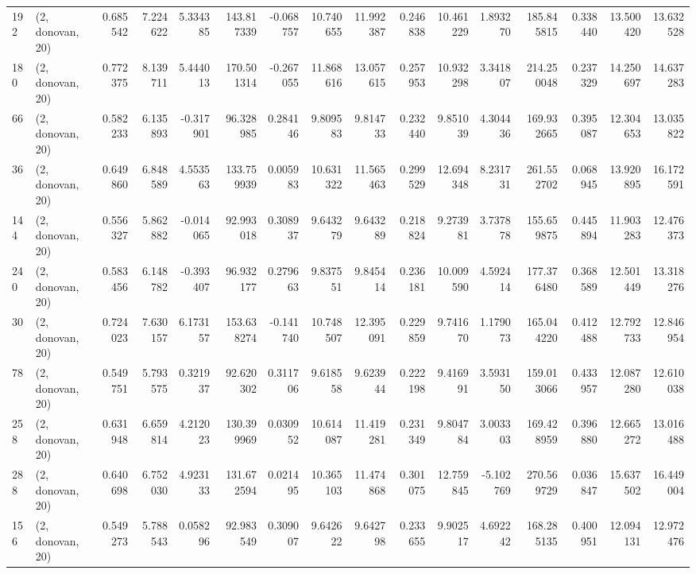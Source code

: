 \begin{tabular}{llrrrrrrrrrrrrrr}
192 &  (2, donovan, 20) &   0.685542 &   7.224622 &   5.334385 &   143.817339 &  -0.068757 &  10.740655 &  11.992387 &  0.246838 &  10.461229 &   1.893270 &   185.845815 &   0.338440 &  13.500420 &  13.632528 \\
180 &  (2, donovan, 20) &   0.772375 &   8.139711 &   5.444013 &   170.501314 &  -0.267055 &  11.868616 &  13.057615 &  0.257953 &  10.932298 &   3.341807 &   214.250048 &   0.237329 &  14.250697 &  14.637283 \\
66  &  (2, donovan, 20) &   0.582233 &   6.135893 &  -0.317901 &    96.328985 &   0.284146 &   9.809583 &   9.814733 &  0.232440 &   9.851039 &   4.304436 &   169.932665 &   0.395087 &  12.304653 &  13.035822 \\
36  &  (2, donovan, 20) &   0.649860 &   6.848589 &   4.553563 &   133.759939 &   0.005983 &  10.631322 &  11.565463 &  0.299529 &  12.694348 &   8.231731 &   261.552702 &   0.068945 &  13.920895 &  16.172591 \\
144 &  (2, donovan, 20) &   0.556327 &   5.862882 &  -0.014065 &    92.993018 &   0.308937 &   9.643279 &   9.643289 &  0.218824 &   9.273981 &   3.737878 &   155.659875 &   0.445894 &  11.903283 &  12.476373 \\
240 &  (2, donovan, 20) &   0.583456 &   6.148782 &  -0.393407 &    96.932177 &   0.279663 &   9.837551 &   9.845414 &  0.236181 &  10.009590 &   4.592414 &   177.376480 &   0.368589 &  12.501449 &  13.318276 \\
30  &  (2, donovan, 20) &   0.724023 &   7.630157 &   6.173157 &   153.638274 &  -0.141740 &  10.748507 &  12.395091 &  0.229859 &   9.741670 &   1.179073 &   165.044220 &   0.412488 &  12.792733 &  12.846954 \\
78  &  (2, donovan, 20) &   0.549751 &   5.793575 &   0.321937 &    92.620302 &   0.311706 &   9.618558 &   9.623944 &  0.222198 &   9.416991 &   3.593150 &   159.013066 &   0.433957 &  12.087280 &  12.610038 \\
258 &  (2, donovan, 20) &   0.631948 &   6.659814 &   4.212023 &   130.399969 &   0.030952 &  10.614087 &  11.419281 &  0.231349 &   9.804784 &   3.003303 &   169.428959 &   0.396880 &  12.665272 &  13.016488 \\
288 &  (2, donovan, 20) &   0.640698 &   6.752030 &   4.923133 &   131.672594 &   0.021495 &  10.365103 &  11.474868 &  0.301075 &  12.759845 &  -5.102769 &   270.569729 &   0.036847 &  15.637502 &  16.449004 \\
156 &  (2, donovan, 20) &   0.549273 &   5.788543 &   0.058296 &    92.983549 &   0.309007 &   9.642622 &   9.642798 &  0.233655 &   9.902517 &   4.692242 &   168.285135 &   0.400951 &  12.094131 &  12.972476 \\

\end{tabular}
